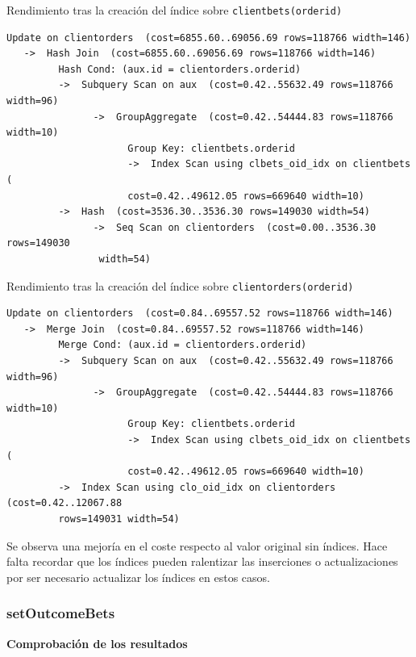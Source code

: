 \documentclass{article}
\begin{document}
Rendimiento tras la creación del índice sobre \texttt{clientbets(orderid)}
\begin{lstlisting}[style=sql]
 Update on clientorders  (cost=6855.60..69056.69 rows=118766 width=146)
   ->  Hash Join  (cost=6855.60..69056.69 rows=118766 width=146)
         Hash Cond: (aux.id = clientorders.orderid)
         ->  Subquery Scan on aux  (cost=0.42..55632.49 rows=118766 width=96)
               ->  GroupAggregate  (cost=0.42..54444.83 rows=118766 width=10)
                     Group Key: clientbets.orderid
                     ->  Index Scan using clbets_oid_idx on clientbets  (
                     cost=0.42..49612.05 rows=669640 width=10)
         ->  Hash  (cost=3536.30..3536.30 rows=149030 width=54)
               ->  Seq Scan on clientorders  (cost=0.00..3536.30 rows=149030
                width=54)
\end{lstlisting}

Rendimiento tras la creación del índice sobre \texttt{clientorders(orderid)}
\begin{lstlisting}[style=sql]
 Update on clientorders  (cost=0.84..69557.52 rows=118766 width=146)
   ->  Merge Join  (cost=0.84..69557.52 rows=118766 width=146)
         Merge Cond: (aux.id = clientorders.orderid)
         ->  Subquery Scan on aux  (cost=0.42..55632.49 rows=118766 width=96)
               ->  GroupAggregate  (cost=0.42..54444.83 rows=118766 width=10)
                     Group Key: clientbets.orderid
                     ->  Index Scan using clbets_oid_idx on clientbets  (
                     cost=0.42..49612.05 rows=669640 width=10)
         ->  Index Scan using clo_oid_idx on clientorders  (cost=0.42..12067.88 
         rows=149031 width=54)

\end{lstlisting}

Se observa una mejoría en el coste respecto al valor original sin índices. Hace falta recordar que los índices pueden ralentizar las inserciones o actualizaciones por ser necesario actualizar los índices en estos casos.

\subsubsection{setOutcomeBets}

\textbf{Comprobación de los resultados}
\end{document}
